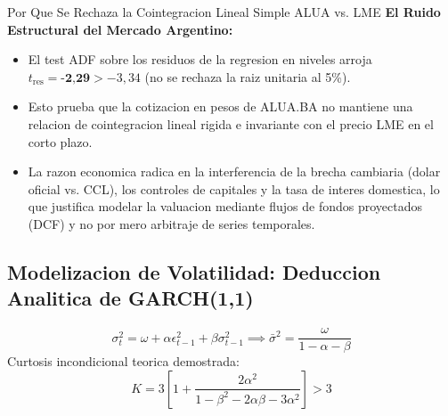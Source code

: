 \documentclass[10pt,a4paper]{article}
\theoremstyle{definition}
\begin{document}
\begin{conceptbox}{Por Que Se Rechaza la Cointegracion Lineal Simple ALUA vs. LME}
\textbf{El Ruido Estructural del Mercado Argentino:}
\begin{itemize}
    \item El test ADF sobre los residuos de la regresion en niveles arroja $t_{\text{res}} = \textbf{-2,29} > -3,34$ (no se rechaza la raiz unitaria al 5\%).
    \item Esto prueba que la cotizacion en pesos de ALUA.BA no mantiene una relacion de cointegracion lineal rigida e invariante con el precio LME en el corto plazo.
    \item La razon economica radica en la interferencia de la brecha cambiaria (dolar oficial vs. CCL), los controles de capitales y la tasa de interes domestica, lo que justifica modelar la valuacion mediante flujos de fondos proyectados (DCF) y no por mero arbitraje de series temporales.
\end{itemize}
\end{conceptbox}

\subsection{Modelizacion de Volatilidad: Deduccion Analitica de GARCH(1,1)}
\begin{equation}
\sigma_t^2 = \omega + \alpha \epsilon_{t-1}^2 + \beta \sigma_{t-1}^2 \implies \bar{\sigma}^2 = \frac{\omega}{1 - \alpha - \beta}
\end{equation}
Curtosis incondicional teorica demostrada:
\begin{equation}
K = 3 \left[ 1 + \frac{2\alpha^2}{1 - \beta^2 - 2\alpha\beta - 3\alpha^2} \right] > 3
\end{equation}
\end{document}
